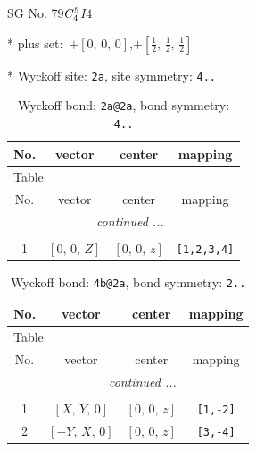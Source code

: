 \documentclass[fleqn,8pt]{jsarticle}
\begin{document}
\setcounter{MaxMatrixCols}{32}

\renewcommand{\tablename}{Table~}
\renewcommand{\figurename}{Figure~}
\begin{center}
\LARGE
SG No. 79\quad$C_{\rm 4}^{5}$\quad$I4$\quad[ tetragonal ]
\end{center}

* plus set:\,\,\,$+\left[ 0,\, 0,\, 0 \right]$,\quad $+\left[ \frac{1}{2},\, \frac{1}{2},\, \frac{1}{2} \right]$


* Wyckoff site: {\tt 2a}, site symmetry: {\tt 4..}
\renewcommand{\arraystretch}{1.2}
\begin{longtable}{cccc}
\caption{Wyckoff bond: {\tt 2a@2a}, bond symmetry: {\tt 4..}}
 \\
 \hline \hline
No. & vector & center & mapping \\ \hline \endfirsthead

\multicolumn{3}{l}{\tablename\ \thetable{}} \\
 \hline \hline
No. & vector & center & mapping \\ \hline \endhead

 \hline \hline
\multicolumn{3}{r}{\footnotesize\it continued ...} \\ \endfoot

 \hline \hline
\multicolumn{3}{r}{} \\ \endlastfoot

1 & $\left[ 0,\, 0,\, Z \right]$ & $\left[ 0,\, 0,\, z \right]$ & {\tt [1,2,3,4]} \\
\end{longtable}
\renewcommand{\arraystretch}{1.2}
\begin{longtable}{cccc}
\caption{Wyckoff bond: {\tt 4b@2a}, bond symmetry: {\tt 2..}}
 \\
 \hline \hline
No. & vector & center & mapping \\ \hline \endfirsthead

\multicolumn{3}{l}{\tablename\ \thetable{}} \\
 \hline \hline
No. & vector & center & mapping \\ \hline \endhead

 \hline \hline
\multicolumn{3}{r}{\footnotesize\it continued ...} \\ \endfoot

 \hline \hline
\multicolumn{3}{r}{} \\ \endlastfoot

1 & $\left[ X,\, Y,\, 0 \right]$ & $\left[ 0,\, 0,\, z \right]$ & {\tt [1,-2]} \\ \hline
2 & $\left[ - Y,\, X,\, 0 \right]$ & $\left[ 0,\, 0,\, z \right]$ & {\tt [3,-4]} \\
\end{longtable}
\end{document}
